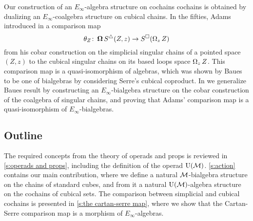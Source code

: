 Our construction of an $E_\infty$-algebra structure on cochains cochains is obtained by dualizing an $E_\infty$-coalgebra structure on cubical chains.
In the fifties, Adams introduced in \cite{adams1956cobar} a comparison map
\[
\theta_Z \colon \operatorname{\mathbf{\Omega}} S^\triangle(Z,z) \to S^\square(\operatorname{\Omega}_z Z)
\]
from his cobar construction on the simplicial singular chains of a pointed space $(Z, z)$ to the cubical singular chains on its based loops space $\operatorname{\Omega}_z Z$.
This comparison map is a quasi-isomorphism of algebras, which was shown by Baues \cite{baues1998hopf} to be one of bialgebras by considering Serre's cubical coproduct.
In \cite{medina2021cobar} we generalize Baues result by constructing an $E_{\infty}$-bialgebra structure on the cobar construction of the coalgebra of singular chains, and proving that Adams' comparison map is a quasi-isomorphism of $E_{\infty}$-bialgebras.

\subsection*{Outline}

The required concepts from the theory of operads and props is reviewed in \cref{s:operads and props}, including the definition of the operad ${\operatorname{U}(\mathcal{M})}$.
\cref{s:action} contains our main contribution, where we define a natural $\mathcal{M}$-bialgebra structure on the chains of standard cubes, and from it a natural ${\operatorname{U}(\mathcal{M})}$-algebra structure on the cochains of cubical sets.
The comparison between simplicial and cubical cochains is presented in \cref{s:the cartan-serre map}, where we show that the Cartan-Serre comparison map is a morphism of $E_\infty$-algebras.